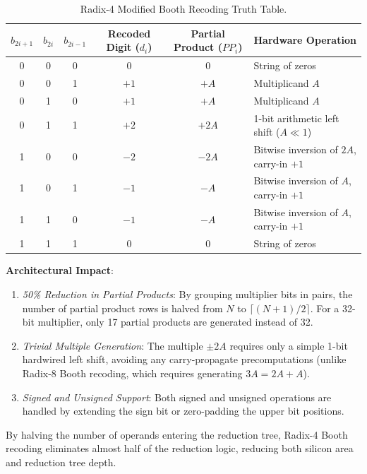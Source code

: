 \begin{table}[htbp]
\centering
\small
\begin{tabular}{|ccc|c|c|l|}
\hline
$b_{2i+1}$ & $b_{2i}$ & $b_{2i-1}$ & Recoded Digit ($d_i$) & Partial Product ($PP_i$) & Hardware Operation \\
\hline
0 & 0 & 0 &  $0$ &  $0$          & String of zeros \\
0 & 0 & 1 & $+1$ & $+A$          & Multiplicand $A$ \\
0 & 1 & 0 & $+1$ & $+A$          & Multiplicand $A$ \\
0 & 1 & 1 & $+2$ & $+2A$         & 1-bit arithmetic left shift ($A \ll 1$) \\
1 & 0 & 0 & $-2$ & $-2A$         & Bitwise inversion of $2A$, carry-in $+1$ \\
1 & 0 & 1 & $-1$ & $-A$          & Bitwise inversion of $A$, carry-in $+1$ \\
1 & 1 & 0 & $-1$ & $-A$          & Bitwise inversion of $A$, carry-in $+1$ \\
1 & 1 & 1 &  $0$ &  $0$          & String of zeros \\
\hline
\end{tabular}
\caption{Radix-4 Modified Booth Recoding Truth Table.}
\label{tab:booth_radix4}
\end{table}

\textbf{Architectural Impact}:
\begin{enumerate}
    \item \textit{50\% Reduction in Partial Products}: By grouping multiplier bits in pairs, the number of partial product rows is halved from $N$ to $\lceil (N + 1) / 2 \rceil$. For a 32-bit multiplier, only 17 partial products are generated instead of 32.
    
    \item \textit{Trivial Multiple Generation}: The multiple $\pm 2A$ requires only a simple 1-bit hardwired left shift, avoiding any carry-propagate precomputations (unlike Radix-8 Booth recoding, which requires generating $3A = 2A + A$).
    
    \item \textit{Signed and Unsigned Support}: Both signed and unsigned operations are handled by extending the sign bit or zero-padding the upper bit positions.
\end{enumerate}
By halving the number of operands entering the reduction tree, Radix-4 Booth recoding eliminates almost half of the reduction logic, reducing both silicon area and reduction tree depth.

